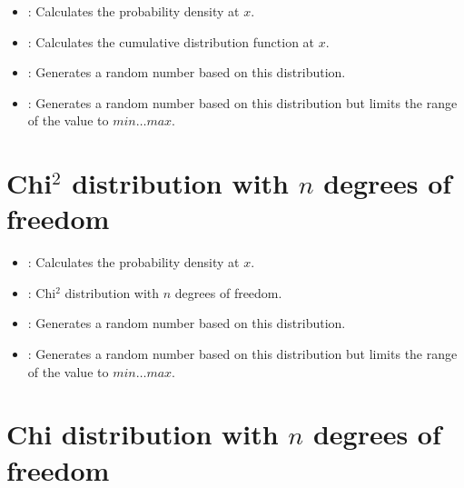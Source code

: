 \begin{itemize}

\item
{}:
Calculates the probability density at $x$.

\item
{}:
Calculates the cumulative distribution function at $x$.

\item
{}:
Generates a random number based on this distribution.

\item
{}:
Generates a random number based on this distribution but limits the range of the value to $min\ldots max$.

\end{itemize}



\section{\texorpdfstring{Chi$^2$}{Chi2} distribution with \texorpdfstring{$n$}{n} degrees of freedom}

\begin{itemize}

\item
{}:
Calculates the probability density at $x$.

\item
{}:
Chi$^2$ distribution with $n$ degrees of freedom.

\item
{}:
Generates a random number based on this distribution.

\item
{}:
Generates a random number based on this distribution but limits the range of the value to $min\ldots max$.

\end{itemize}



\section{Chi distribution with \texorpdfstring{$n$}{n} degrees of freedom}

